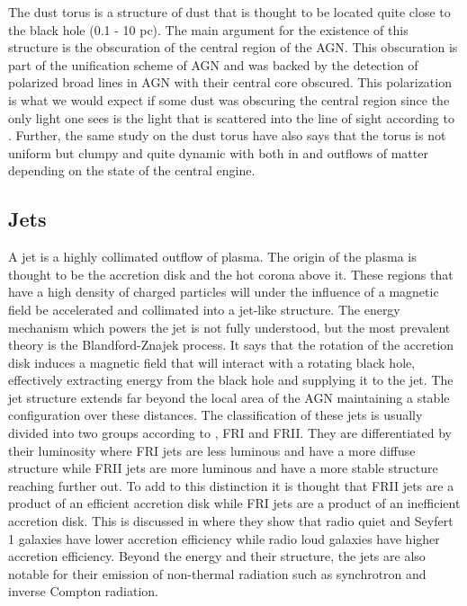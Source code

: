 The dust torus is a structure of dust that is thought to be located quite close to the black hole (0.1 - 10 pc). The main argument for the existence of this structure is the obscuration of the central region of the AGN. This obscuration 
is part of the unification scheme of AGN and was backed by the detection of polarized broad lines in AGN with their central core obscured. This polarization is what we would expect if some dust was obscuring the central region since the only light one sees is 
the light that is scattered into the line of sight according to \cite{MASON201597}. Further, the same study on the dust torus have also says that the torus is not uniform but clumpy and quite dynamic with both in and outflows of matter depending on the state of the central engine. 





\subsection{Jets}
\label{sec:jets}

A jet is a highly collimated outflow of plasma. The origin of the plasma is thought to be the accretion disk and the hot corona above it. These regions that have a high density of charged particles will under the influence of a magnetic field be accelerated and collimated into a jet-like structure.
The energy mechanism which powers the jet is not fully understood, but the most prevalent theory is the Blandford-Znajek process. It says that the rotation of the accretion disk induces a magnetic field that will interact with a rotating black hole, effectively extracting energy from the black hole and supplying it to the jet. 
The jet structure extends far beyond the local area of the AGN maintaining a stable configuration over these distances. The classification of these jets is usually divided into two groups according to \cite{walg2013relativistic}, FRI and FRII. They are differentiated by their luminosity where FRI jets are less luminous and have a more diffuse structure while FRII jets are more luminous and have a more stable structure reaching further out.
To add to this distinction it is thought that FRII jets are a product of an efficient accretion disk while FRI jets are a product of an inefficient accretion disk. This is discussed in \cite{Wei-Hao_2003} where they show that radio quiet and Seyfert 1 galaxies have lower accretion efficiency while radio loud galaxies have higher accretion efficiency. 
Beyond the energy and their structure, the jets are also notable for their emission of non-thermal radiation such as synchrotron and inverse Compton radiation. %







